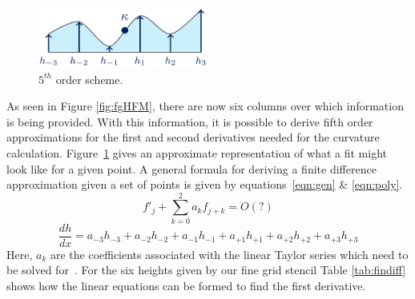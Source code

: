 \begin{figure}[htbp]
	\centering
	\includegraphics[width=0.5\textwidth]{figs/5thorder.png}
	\caption{$5^{th}$ order scheme.}
	\label{fig:5th} 
\end{figure} 

As seen in Figure \ref{fig:fgHFM}, there are now six columns over which information is being provided. With this information, it is possible to derive fifth order approximations for the first and second derivatives needed for the curvature calculation. Figure~\ref{fig:5th} gives an approximate representation of what a fit might look like for a given point. A general formula for deriving a finite difference approximation given a set of points is given by equations~\ref{eqn:gen}  \& \ref{eqn:poly}. 
\begin{equation}
f'_j + \sum_{k=0}^{2} a_k f_{j+k} = O(?)
\label{eqn:gen}
\end{equation}
\begin{equation}
\frac{dh}{dx} = a_{-3}h_{-3} +a_{-2}h_{-2} + a_{-1}h_{-1} + a_{+1}h_{+1} + a_{+2}h_{+2} + a_{+3}h_{+3} 
\label{eqn:poly}
\end{equation}
\noindent Here, $a_k$ are the coefficients associated with the linear Taylor series which need to be solved for~\cite{moin}. For the six heights given by our fine grid stencil Table \ref{tab:findiff} shows how the linear equations can be formed to find the first derivative.



